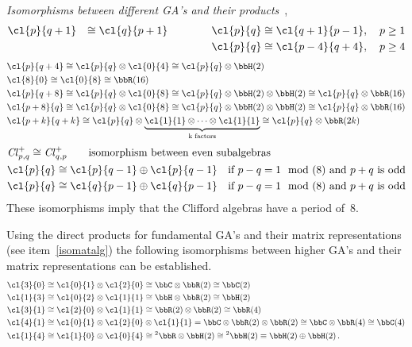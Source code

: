 \begin{unit}
\textit{Isomorphisms between different GA's and their
products}~\cite{Rausch05,Lounesto97,Porteous95},
\label{periodicityTableExtension}
\begin{alignat*}{3}
&\cl{p}{q+1}&\cong\cl{q}{p+1}\qquad\quad &&\cl{p}{q}&\cong\cl{q+1}{p-1},\quad p\ge1\\
&&&&\cl{p}{q}&\cong\cl{p-4}{q+4},\quad p\ge4
\end{alignat*}
\[\begin{split}
&\cl{p}{q+4}\cong\cl{p}{q}\otimes\cl{0}{4}\cong\cl{p}{q}\otimes\bbH(2)\\
&\cl{8}{0}\cong\cl{0}{8}\cong\bbR(16)\\
&\cl{p}{q+8}\cong\cl{p}{q}\otimes\cl{0}{8}\cong\cl{p}{q}\otimes\bbH(2)\otimes\bbH(2)\cong\cl{p}{q}\otimes\bbR(16)\\
&\cl{p+8}{q}\cong\cl{p}{q}\otimes\cl{0}{8}\cong\cl{p}{q}\otimes\bbH(2)\otimes\bbH(2)\cong\cl{p}{q}\otimes\bbR(16)\\
&\cl{p+k}{q+k}\cong\cl{p}{q}\otimes\underbrace{\cl{1}{1}\otimes\dots\otimes\cl{1}{1}}_{\textrm{k
factors}}
\cong\cl{p}{q}\otimes\bbR(2k)\\
\end{split}\]
%
\[
\begin{split}
&\mathit{Cl}^{+}_{p,q}\cong \mathit{Cl}^{+}_{q,p}\qquad\textrm{isomorphism between even subalgebras}\\
&\cl{p}{q}\cong \cl{p}{q-1}\oplus \cl{p}{q-1}\quad \textrm{if $p-q=1\mod(8)$ and $p+q$ is odd}\\
&\cl{p}{q}\cong \cl{q}{p-1}\oplus \cl{q}{p-1}\quad \textrm{if $p-q=1\mod(8)$ and $p+q$ is odd}
\end{split}
\]
These isomorphisms imply that the Clifford algebras have a period
of~8.
\end{unit}
%
\begin{example}
Using the direct products for fundamental GA's and their matrix
representations (see item~\ref{isomatalg}) the following
isomorphisms between higher GA's and their matrix representations
can be established.
\begin{equation*}\begin{split}
&\cl{3}{0}\cong\cl{0}{1}\otimes\cl{2}{0}\cong\bbC\otimes\bbR(2)\cong\bbC(2)\\
&\cl{1}{3}\cong\cl{0}{2}\otimes\cl{1}{1}\cong\bbH\otimes\bbR(2)\cong\bbH(2)\\
&\cl{3}{1}\cong\cl{2}{0}\otimes\cl{1}{1}\cong\bbR(2)\otimes\bbR(2)\cong\bbR(4)\\
&\cl{4}{1}\cong\cl{0}{1}\otimes\cl{2}{0}\otimes\cl{1}{1}=\bbC\otimes\bbR(2)\otimes\bbR(2)
\cong\bbC\otimes\bbR(4)\cong\bbC(4)\\
&\cl{1}{4}\cong\cl{1}{0}\otimes\cl{0}{4}\cong{^2\bbR}\otimes\bbH(2)\cong{^2\bbH(2)}\equiv\bbH(2)\oplus\bbH(2)\,.
\end{split}\end{equation*}
\end{example}
